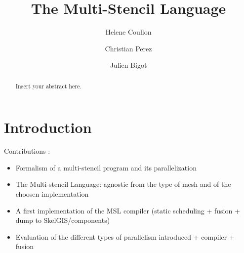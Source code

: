 \documentclass[smallextended]{svjour3}       %
\begin{document}
\title{The Multi-Stencil Language}


\author{Helene Coullon \and
        Christian Perez \and
        Julien Bigot
}





\maketitle

\begin{abstract}
Insert your abstract here.
\end{abstract}

\section{Introduction}
\label{sect:introduction}
Contributions :
\begin{itemize}
\item Formalism of a multi-stencil program and its parallelization
\item The Multi-stencil Language: agnostic from the type of mesh and of the choosen implementation
\item A first implementation of the MSL compiler (static scheduling + fusion + dump to SkelGIS/components)
\item Evaluation of the different types of parallelism introduced + compiler + fusion
\end{itemize}
\end{document}
